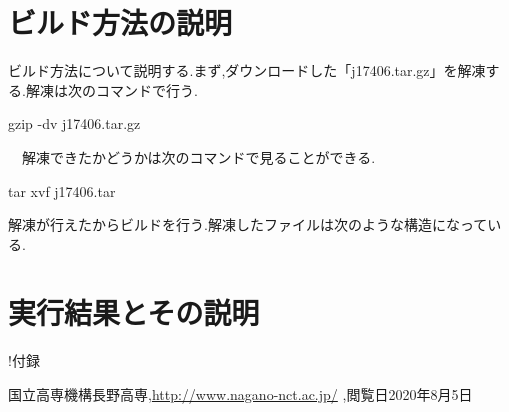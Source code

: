 \documentclass[a4j]{jarticle}
\begin{document}
    \section{ビルド方法の説明}
    ビルド方法について説明する.まず,ダウンロードした「j17406.tar.gz」を解凍する.解凍は次のコマンドで行う.
  \begin{screen}
    gzip -dv j17406.tar.gz
  \end{screen}
  　解凍できたかどうかは次のコマンドで見ることができる.
  \begin{screen}
    tar xvf j17406.tar
  \end{screen}
  解凍が行えたからビルドを行う.解凍したファイルは次のような構造になっている.
    \section{実行結果とその説明}

    !付録
        \begin{thebibliography}{9}
            国立高専機構長野高専,\url{http://www.nagano-nct.ac.jp/} ,閲覧日2020年8月5日
          \end{thebibliography}
\end{document}
